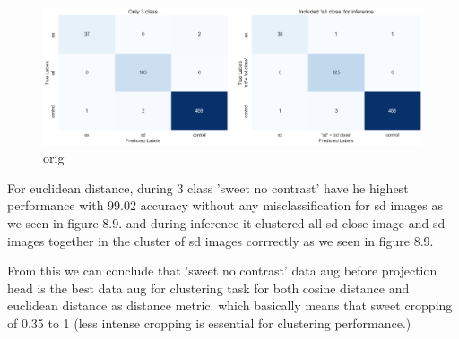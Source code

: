 \begin{table}[H]
    \centering
    \caption{Inference evaluation results on Euclidean distance based on K-means}
    \label{tab:professional_table}
\end{table}

\begin{figure}[H]
    \centering
    \includegraphics[scale=0.37]{figures/econfuse.png} 
    \caption{orig}
    \label{fig:econfuse.png}
\end{figure}


For euclidean distance, during 3 class 'sweet no contrast' have he highest performance with 99.02 accuracy without any misclassification for sd images as we seen 
in figure 8.9. and during inference it clustered all sd close image and sd images together in the cluster of sd images corrrectly as we seen in figure 8.9.


From this we can conclude that 'sweet no contrast' data aug before projection head is the best data aug for clustering task for both
 cosine distance and euclidean distance as distance metric. which basically means that sweet cropping of 0.35 to 1 (less intense cropping is essential for clustering performance.)



